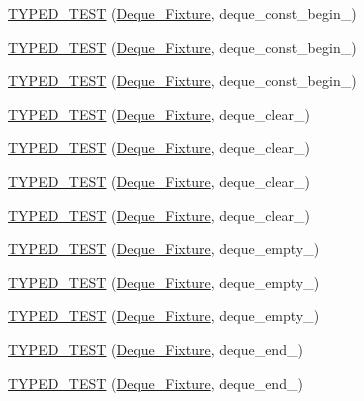 \begin{DoxyCompactItemize}
\item 
\hyperlink{TestDeque_8c_09_09_ad3568cd1debe5a4e9d39385797888eb0}{T\-Y\-P\-E\-D\-\_\-\-T\-E\-S\-T} (\hyperlink{structDeque__Fixture}{Deque\-\_\-\-Fixture}, deque\-\_\-const\-\_\-begin\-\_)
\item 
\hyperlink{TestDeque_8c_09_09_a9e6df0ff09a75882aeb31c9b4337cce8}{T\-Y\-P\-E\-D\-\_\-\-T\-E\-S\-T} (\hyperlink{structDeque__Fixture}{Deque\-\_\-\-Fixture}, deque\-\_\-const\-\_\-begin\-\_)
\item 
\hyperlink{TestDeque_8c_09_09_a43a18399f5f825cd7c34e68ab972dc06}{T\-Y\-P\-E\-D\-\_\-\-T\-E\-S\-T} (\hyperlink{structDeque__Fixture}{Deque\-\_\-\-Fixture}, deque\-\_\-const\-\_\-begin\-\_)
\item 
\hyperlink{TestDeque_8c_09_09_a38a1f3c19830d035e5eaae813529cb3c}{T\-Y\-P\-E\-D\-\_\-\-T\-E\-S\-T} (\hyperlink{structDeque__Fixture}{Deque\-\_\-\-Fixture}, deque\-\_\-clear\-\_)
\item 
\hyperlink{TestDeque_8c_09_09_a36cca492544990dbf6b7217182b01cd5}{T\-Y\-P\-E\-D\-\_\-\-T\-E\-S\-T} (\hyperlink{structDeque__Fixture}{Deque\-\_\-\-Fixture}, deque\-\_\-clear\-\_)
\item 
\hyperlink{TestDeque_8c_09_09_a7dcd9b60d35aa24540b4d5e74e830d7b}{T\-Y\-P\-E\-D\-\_\-\-T\-E\-S\-T} (\hyperlink{structDeque__Fixture}{Deque\-\_\-\-Fixture}, deque\-\_\-clear\-\_)
\item 
\hyperlink{TestDeque_8c_09_09_a6da0043339c402993f98e43b2d77a999}{T\-Y\-P\-E\-D\-\_\-\-T\-E\-S\-T} (\hyperlink{structDeque__Fixture}{Deque\-\_\-\-Fixture}, deque\-\_\-clear\-\_)
\item 
\hyperlink{TestDeque_8c_09_09_a4bd8decdf655cb961df3c154b5475612}{T\-Y\-P\-E\-D\-\_\-\-T\-E\-S\-T} (\hyperlink{structDeque__Fixture}{Deque\-\_\-\-Fixture}, deque\-\_\-empty\-\_)
\item 
\hyperlink{TestDeque_8c_09_09_a33002cbad1345cea566431f4d360cbe5}{T\-Y\-P\-E\-D\-\_\-\-T\-E\-S\-T} (\hyperlink{structDeque__Fixture}{Deque\-\_\-\-Fixture}, deque\-\_\-empty\-\_)
\item 
\hyperlink{TestDeque_8c_09_09_af47949ff678109be00fff013e9990d0e}{T\-Y\-P\-E\-D\-\_\-\-T\-E\-S\-T} (\hyperlink{structDeque__Fixture}{Deque\-\_\-\-Fixture}, deque\-\_\-empty\-\_)
\item 
\hyperlink{TestDeque_8c_09_09_a36689d5d39d2c022e09c19298b77ecd9}{T\-Y\-P\-E\-D\-\_\-\-T\-E\-S\-T} (\hyperlink{structDeque__Fixture}{Deque\-\_\-\-Fixture}, deque\-\_\-end\-\_)
\item 
\hyperlink{TestDeque_8c_09_09_ab5878e1c71b9c44b52123a0675552087}{T\-Y\-P\-E\-D\-\_\-\-T\-E\-S\-T} (\hyperlink{structDeque__Fixture}{Deque\-\_\-\-Fixture}, deque\-\_\-end\-\_)

\end{DoxyCompactItemize}
